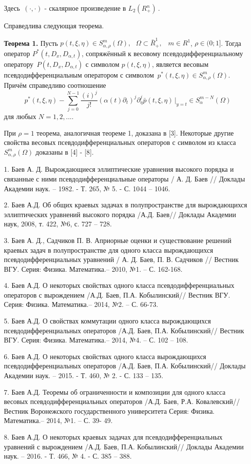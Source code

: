 {Здесь $\,( \cdot , \cdot )$ - скалярное произведение в $L_2 (R_ + ^n )\,$.

Справедлива следующая теорема.

\textbf{Теорема 1.} Пусть $p(t,\xi ,\eta ) \in S_{\alpha ,\rho }^m (\Omega
),\,\,\,\,\Omega \subset \bar {R}_ + ^1 ,\,\,\,\,\,m \in R^1$, $\rho \in
(0;1]$. Тогда оператор $P^\ast (t,D_x ,D_{\alpha ,t} )$, сопряжённый к
весовому псевдодифференциальному оператору $\,P(t,D_x ,D_{\alpha ,t} )$ с
символом $p(t,\xi ,\eta )$, является весовым псевдодифференциальным
оператором с символом $\,p^\ast (t,\xi ,\eta ) \in S_{\alpha ,\rho }^m
(\Omega )$. Причём справедливо соотношение
\[
\,\,p^\ast (t,\xi ,\eta ) - \sum\limits_{j = 0}^{N - 1} {\frac{(i)^j}{j!}}
(\alpha (t)\partial _t )^j\partial _\eta ^j \left. {\bar {p}(t,\xi ,\eta
)\,} \right|_{y = t} \in S_\alpha ^{m - N} (\Omega )
\]
для любых $N = 1,2,...$.



При $\rho = 1$ теорема, аналогичная теореме 1, доказана в [3]. Некоторые
другие свойства весовых псевдодифференциальных операторов с символом из
класса $S_{\alpha ,\rho }^m (\Omega )$ доказаны в [4] - [8].

\litlist

1. Баев А. Д. Вырождающиеся эллиптические уравнения высокого порядка и
связанные с ними псевдодифференциальные операторы / А. Д. Баев // Доклады
Академии наук. -- 1982. - Т. 265, № 5. - С. 1044 -- 1046.

2. Баев А.Д. Об общих краевых задачах в полупространстве для вырождающихся
эллиптических уравнений высокого порядка /А.Д. Баев// Доклады Академии наук,
2008, т. 422, №6, с. 727 -- 728.

3. Баев А. Д., Садчиков П. В. Априорные оценки и существование решений
краевых задач в полупространстве для одного класса вырождающихся
псевдодифференциальных уравнений / А. Д. Баев, П. В. Садчиков // Вестник
ВГУ. Серия: Физика. Математика.-- 2010, №1. -- С. 162-168.

4. Баев А.Д. О некоторых свойствах одного класса псевдодифференциальных
операторов с вырождением /А.Д. Баев, П.А. Кобылинский// Вестник ВГУ. Серия:
Физика. Математика.-- 2014, №2. -- С. 66-73.

5. Баев А.Д. О свойствах коммутации одного класса вырождающихся
псевдодифференциальных операторов /А.Д. Баев, П.А. Кобылинский// Вестник
ВГУ. Серия: Физика. Математика.-- 2014, №4. -- С. 102 -- 108.

6. Баев А.Д. О некоторых свойствах одного класса вырождающихся
псевдодифференциальных операторов /А.Д. Баев, П.А. Кобылинский// Доклады
Академии наук. -- 2015. - Т. 460, № 2. - С. 133 -- 135.

7. Баев А.Д. Теоремы об ограниченности и композиции для одного класса
весовых псевдодифференциальных операторов /А.Д. Баев, Р.А. Ковалевский//
Вестник Воронежского государственного университета Серия: Физика.
Математика.-- 2014, №1. -- С. 39- 49.

8. Баев А.Д. О некоторых краевых задачах для псевдодифференциальных
уравнений с вырождением /А.Д. Баев, П.А. Кобылинский// Доклады Академии
наук. -- 2016. - Т. 466, № 4. - С. 385 -- 388.

}
